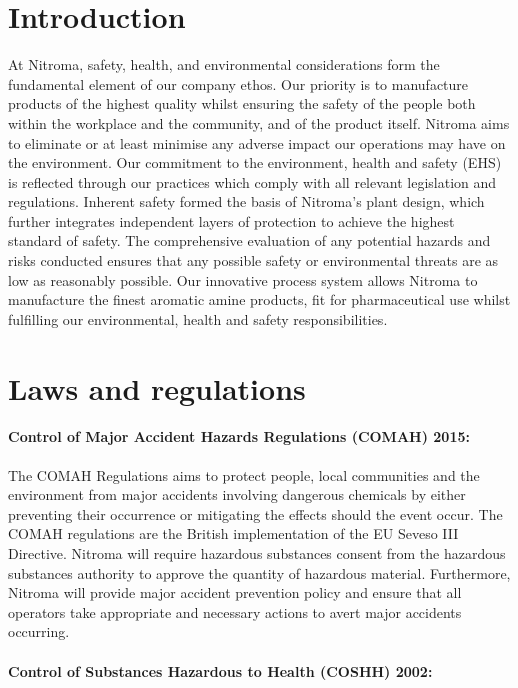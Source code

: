 \section{Introduction}

At Nitroma, safety, health, and environmental considerations form the fundamental element of our company ethos. Our priority is to manufacture products of the highest quality whilst ensuring the safety of the people both within the workplace and the community, and of the product itself. Nitroma aims to eliminate or at least minimise any adverse impact our operations may have on the environment. Our commitment to the environment, health and safety (EHS) is reflected through our practices which comply with all relevant legislation and regulations. Inherent safety formed the basis of Nitroma’s plant design, which further integrates independent layers of protection to achieve the highest standard of safety. The comprehensive evaluation of any potential hazards and risks conducted ensures that any possible safety or environmental threats are as low as reasonably possible. Our innovative process system allows Nitroma to manufacture the finest aromatic amine products, fit for pharmaceutical use whilst fulfilling our environmental, health and safety responsibilities.

\section{Laws and regulations}

\paragraph{Control of Major Accident Hazards Regulations (COMAH) 2015:} 

The COMAH Regulations aims to protect people, local communities and the environment from major accidents involving dangerous chemicals by either preventing their occurrence or mitigating the effects should the event occur. The COMAH regulations are the British implementation of the EU Seveso III Directive. Nitroma will require hazardous substances consent from the hazardous substances authority to approve the quantity of hazardous material. Furthermore, Nitroma will provide major accident prevention policy and ensure that all operators take appropriate and necessary actions to avert major accidents occurring. 

\paragraph{Control of Substances Hazardous to Health (COSHH) 2002:}

